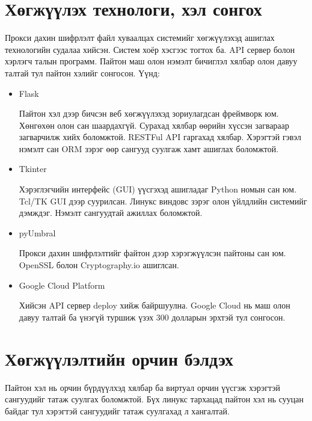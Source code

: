 \section{Хөгжүүлэх технологи, хэл сонгох}

Прокси дахин шифрлэлт файл хуваалцах системийг хөгжүүлэхэд ашиглах технологийн судалаа хийсэн.
Систем хоёр хэсгээс тогтох ба. API сервер болон хэрлэгч талын программ. Пайтон маш олон нэмэлт бичиглэл хялбар олон давуу талтай тул пайтон хэлийг сонгосон. Үүнд:
\begin{itemize}
    \item Flask
    
    Пайтон хэл дээр бичсэн веб хөгжүүлэхэд зориулагдсан фреймворк юм. Хөнгөхөн олон сан шаардахгүй. Сурахад хялбар өөрийн хүссэн загвараар загварчилж хийх боломжтой. RESTFul API гаргахад хялбар. Хэрэгтэй гэвэл нэмэлт сан ORM зэрэг өөр сангууд суулгаж хамт ашиглах боломжтой.
    \item Tkinter
    
    Хэрэглэгчийн интерфейс (GUI) үүсгэхэд ашигладаг Python номын сан юм. Tcl/TK GUI дээр суурилсан. Линукс виндовс зэрэг олон үйлдлийн системийг дэмждэг. Нэмэлт сангуудтай ажиллах боломжтой.
    \item pyUmbral
    
    Прокси дахин шифрлэлтийг файтон дээр хэрэгжүүлсэн пайтоны сан юм. OpenSSL болон Cryptography.io ашиглсан.
    \item Google Cloud Platform
    
    Хийсэн API сервер deploy хийж байршуулна. Google Cloud нь маш олон давуу талтай ба үнэгүй туршиж үзэх 300 долларын эрхтэй тул сонгосон.
\end{itemize}

\section{Хөгжүүлэлтийн орчин бэлдэх}

Пайтон хэл нь орчин бүрдүүлхэд хялбар ба виртуал орчин үүсгэж хэрэгтэй сангуудийг татаж суулгах боломжтой. Бүх линукс тархацад пайтон хэл нь сууцан байдаг тул хэрэгтэй сангуудийг татаж суулгахад л хангалтай.

